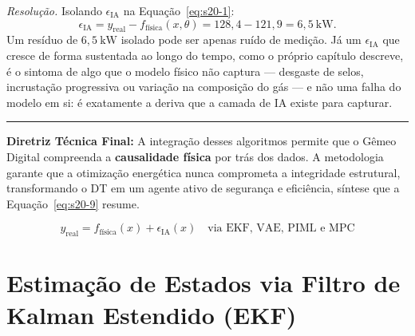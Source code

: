 \documentclass[12pt,a4paper]{article}
\numberwithin{equation}{section}
\numberwithin{table}{section}
\numberwithin{figure}{section}
\begin{document}
{	\emph{Resolução.} Isolando $\epsilon_{\text{IA}}$ na
	Equação~\eqref{eq:s20-1}:
	$$\epsilon_{\text{IA}} = y_{\text{real}} - f_{\text{física}}(x,\theta)
	= 128{,}4 - 121{,}9 = 6{,}5\ \mathrm{kW}.$$
	Um resíduo de $6{,}5\ \mathrm{kW}$ isolado pode ser apenas ruído de
	medição. Já um $\epsilon_{\text{IA}}$ que cresce de forma sustentada ao
	longo do tempo, como o próprio capítulo descreve, é o sintoma de algo
	que o modelo físico não captura --- desgaste de selos, incrustação
	progressiva ou variação na composição do gás --- e não uma falha do
	modelo em si: é exatamente a deriva que a camada de IA existe para
	capturar.

	\vspace{1em}
	\hrule
	\vspace{1em}

	\textbf{Diretriz Técnica Final:} A integração desses algoritmos permite que o Gêmeo Digital compreenda a \textbf{causalidade física} por trás dos dados. A metodologia garante que a otimização energética nunca comprometa a integridade estrutural, transformando o DT em um agente ativo de segurança e eficiência, síntese que a Equação~\eqref{eq:s20-9} resume.

	\begin{equation}\label{eq:s20-9}
 \boxed{y_{\text{real}} = f_{\text{física}}(x) + \epsilon_{\text{IA}}(x) \quad \text{via EKF, VAE, PIML e MPC}} 
\end{equation}


	
	\clearpage
	\section{Estimação de Estados via Filtro de Kalman Estendido (EKF)}

}
\end{document}
